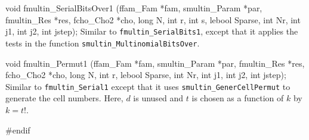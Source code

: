 void fmultin_SerialBitsOver1 (ffam_Fam *fam, smultin_Param *par,
                              fmultin_Res *res, fcho_Cho2 *cho,
                              long N, int r, int s, lebool Sparse,
                              int Nr, int j1, int j2, int jstep);
\endcode
\tab
 Similar to {\tt fmultin\_SerialBits1}, except that it applies the
 tests in the function {\tt smultin\_Mul\-ti\-no\-mialBitsOver}.
\endtab
\code


void fmultin_Permut1 (ffam_Fam *fam, smultin_Param *par,
                      fmultin_Res *res, fcho_Cho2 *cho,
                      long N, int r, lebool Sparse,
                      int Nr, int j1, int j2, int jstep);
\endcode
\tab
 Similar to {\tt fmultin\_Serial1} except that it uses
 {\tt smultin\_GenerCellPermut} to generate the cell numbers.
 Here, $d$ is unused and $t$ is chosen as a function of $k$ by $k=t!$.
\endtab

\code
\hide
#endif
\endhide
\endcode
